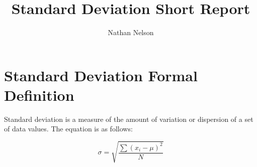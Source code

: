 \documentclass[12pt]{article}
\begin{document}
\title{Standard Deviation Short Report}
\author{Nathan Nelson}

\maketitle

\section{Standard Deviation Formal Definition}

Standard deviation is a measure of the amount of variation or dispersion of a set of data values. The equation is as follows:

\begin{equation}
	\sigma = \sqrt{\frac{\sum {(x_i-\mu) }^2}{N}}
\end{equation}
\end{document}
